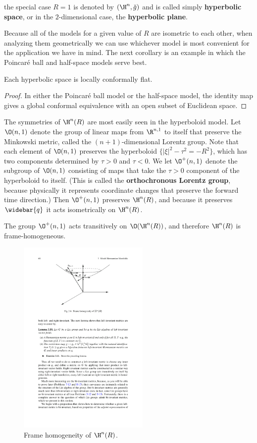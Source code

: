 the special case $R=1$ is denoted by $(\H^n,\breve{g})$ and is called simply 
\textbf{hyperbolic space}, or in the $2$-dimensional case, the \textbf{hyperbolic plane}.\par
Because all of the models for a given value of $R$ are isometric to each other, when analyzing 
them geometrically we can use whichever model is most convenient for the application we have 
in mind. The next corollary is an example in which the Poincar\'e ball and half-space 
models serve best.
\begin{corollary}
Each hyperbolic space is locally conformally flat.
\end{corollary}
\begin{proof}
In either the Poincar\'e ball model or the half-space model, the identity map gives a 
global conformal equivalence with an open subset of Euclidean space.
\end{proof}
The symmetries of $\H^n(R)$ are most easily seen in the hyperboloid model. Let $\O(n,1)$ 
denote the group of linear maps from $\R^{n,1}$ to itself that preserve the Minkowski metric, 
called the $(n+1)$-dimensional Lorentz group. Note that each element of $\O(n,1)$ preserves 
the hyperboloid $\{|\xi|^2-\tau^2=-R^2\}$, which has two components determined by $\tau>0$ 
and $\tau<0$. We let $\O^+(n,1)$ denote the subgroup of $\O(n,1)$ consisting of maps that 
take the $\tau>0$ component of the hyperboloid to itself. (This is called the 
\textbf{orthochronous Lorentz group}, because physically it represents coordinate changes 
that preserve the forward time direction.) Then $\O^+(n,1)$ preserves $\H^{n}(R)$, and 
because it preserves $\widebar{q}$ it acts isometrically on $\H^n(R)$.
\begin{proposition}\label{hyperbolic frame homogeneous}
The group $\O^+(n,1)$ acts transitively on $\O(\H^n(R))$, and therefore $\H^n(R)$ is frame-homogeneous.
\end{proposition}
\begin{figure}[htbp]
\centering
\includegraphics[width=180pt]{pictures/hyperbolic-space-homogeneous}
\caption{Frame homogeneity of $\H^n(R)$.}
\end{figure}
